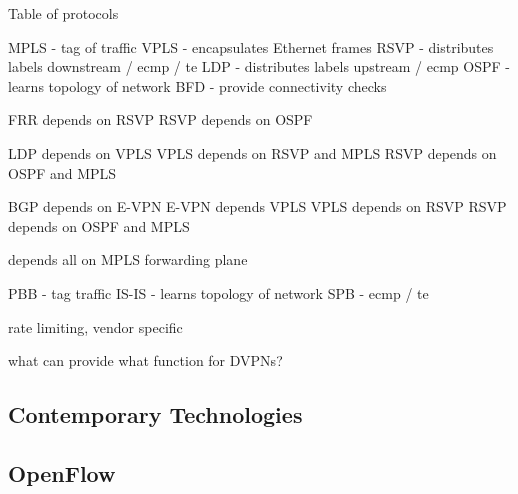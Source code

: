Table of protocols

MPLS - tag of traffic
VPLS - encapsulates Ethernet frames
RSVP - distributes labels downstream / ecmp / te
LDP - distributes labels upstream / ecmp
OSPF - learns topology of network
BFD - provide connectivity checks

FRR depends on RSVP
RSVP depends on OSPF

LDP depends on VPLS
VPLS depends on RSVP and MPLS
RSVP depends on OSPF and MPLS

BGP depends on E-VPN
E-VPN depends VPLS
VPLS depends on RSVP
RSVP depends on OSPF and MPLS

depends all on MPLS forwarding plane

PBB - tag traffic
IS-IS - learns topology of network
SPB - ecmp / te

rate limiting, vendor specific

what can provide what function for DVPNs?

\subsection{Contemporary Technologies} %
\label{sub:contemporary_technologies}


\subsection{OpenFlow} %
\label{sub:openflow}


